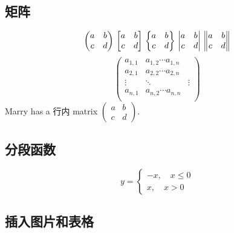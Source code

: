 \documentclass[UTF8]{ctexart}
\begin{document}
 \subsection{矩阵}
     \[ \begin{pmatrix}
             a & b \\c&d
         \end{pmatrix} \\
         \begin{bmatrix}
             a & b \\c&d
         \end{bmatrix} \\
         \begin{Bmatrix}
             a & b \\c&d
         \end{Bmatrix} \\
         \begin{vmatrix}
             a & b \\c&d
         \end{vmatrix} \\
         \begin{Vmatrix}
             a & b \\c&d
         \end{Vmatrix}
     \]
     \[ \begin{pmatrix}
             a_{1,1} & a_{1,2} \cdots a_{1,n}          \\
             a_{2,1} & a_{2,2} \cdots a_{2,n}          \\
             \vdots  & \ddots                 & \vdots \\
             a_{n,1} & a_{n,2} \cdots a_{n,n}          \\
         \end{pmatrix}
     \]
     Marry has a 行内 matrix $ ( \begin{smallmatrix} a&b\\c&d \end{smallmatrix} ) $.
 \subsection{分段函数}
     \[ y= \begin{cases}
             -x,\quad x\leq 0 \\
             x,\quad x>0
         \end{cases} \]
 \subsection{插入图片和表格}
\end{document}
